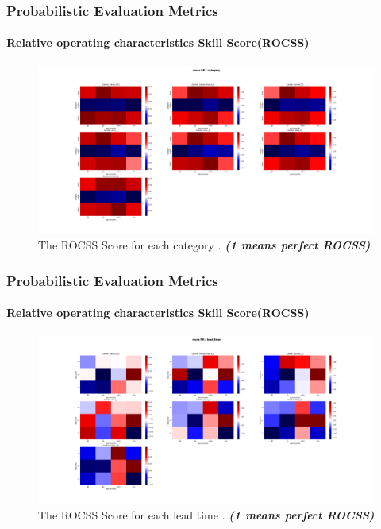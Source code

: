 \begin{frame}
\frametitle{Probabilistic Evaluation Metrics}
\framesubtitle{Relative operating characteristics Skill Score(ROCSS)}

\begin{figure}[H]
    \centering
    \includegraphics[scale=0.15]{rocss_RR_category.png}
    \caption{The ROCSS Score for each category  . \textbf{\textit{(1 means perfect ROCSS)}}}
\end{figure}
\end{frame}

\begin{frame}
\frametitle{Probabilistic Evaluation Metrics}
\framesubtitle{Relative operating characteristics Skill Score(ROCSS)}

\begin{figure}[H]
    \centering
    \includegraphics[scale=0.15]{rocss_RR_lead_time.png}
    \caption{The ROCSS Score for each lead time  . \textbf{\textit{(1 means perfect ROCSS)}}}
\end{figure}
\end{frame}




